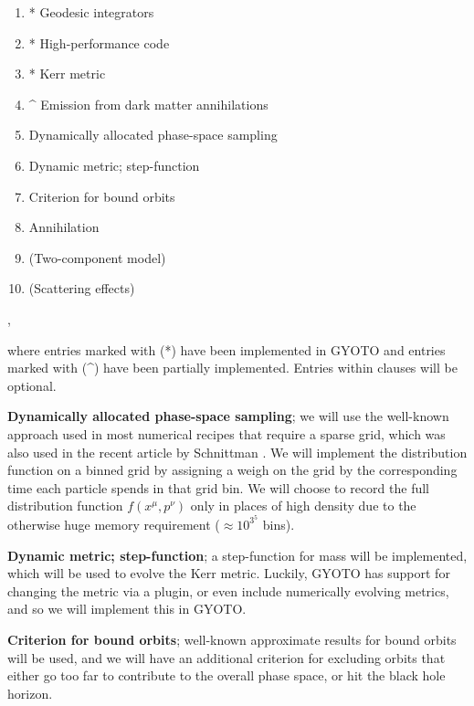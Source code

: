 \documentclass[a4paper,10pt]{article}
\begin{document}
\begin{enumerate}
 \item * Geodesic integrators
 \item * High-performance code %
 \item * Kerr metric
 \item ^ Emission from dark matter annihilations
 \item Dynamically allocated phase-space sampling
 \item Dynamic metric; step-function
 \item Criterion for bound orbits
 \item Annihilation
 \item (Two-component model)
 \item (Scattering effects)
\end{enumerate},

where entries marked with (*) have been implemented in GYOTO \citep{gyoto_vincent_2011} and entries marked with (^) have been partially implemented. 
Entries within clauses will be optional.

\textbf{Dynamically allocated phase-space sampling}; we will use the well-known approach used in most numerical recipes that require 
a sparse grid, which was also used in the recent article by Schnittman \citep{schnittman2015}. %
We will implement the distribution function on a binned grid by assigning a weigh on the grid by the corresponding time each particle spends in 
that grid bin. We will choose to record the full distribution function $f(x^\mu,p^\nu)$ only in places of high density due to the otherwise 
huge memory requirement ($\approx 10^3^5$ bins).

\textbf{Dynamic metric; step-function}; a step-function for mass will be implemented, which will be used to evolve the Kerr metric. 
Luckily, GYOTO has support for changing the metric via a plugin, or even include numerically evolving metrics, and so we will 
implement this in GYOTO.

\textbf{Criterion for bound orbits}; well-known approximate results for bound orbits will be used, and we will have an additional criterion 
for excluding orbits that either go too far to contribute to the overall phase space, or hit the black hole horizon.

\end{document}
